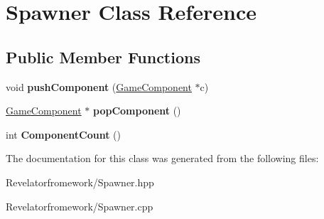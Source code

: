 \hypertarget{class_spawner}{\section{Spawner Class Reference}
\label{class_spawner}
}
\subsection*{Public Member Functions}
\begin{DoxyCompactItemize}
\item 
\hypertarget{class_spawner_a56762cb03662152ffb517f44f431599b}{void {\bfseries push\-Component} (\hyperlink{class_game_component}{Game\-Component} $\ast$c)}\label{class_spawner_a56762cb03662152ffb517f44f431599b}

\item 
\hypertarget{class_spawner_a2cb984bed31cef93edcb9dcfc27f47d0}{\hyperlink{class_game_component}{Game\-Component} $\ast$ {\bfseries pop\-Component} ()}\label{class_spawner_a2cb984bed31cef93edcb9dcfc27f47d0}

\item 
\hypertarget{class_spawner_a9b6caf4f8e980acd1537050792ab8583}{int {\bfseries Component\-Count} ()}\label{class_spawner_a9b6caf4f8e980acd1537050792ab8583}

\end{DoxyCompactItemize}


The documentation for this class was generated from the following files\-:\begin{DoxyCompactItemize}
\item 
Revelatorfromework/Spawner.\-hpp\item 
Revelatorfromework/Spawner.\-cpp\end{DoxyCompactItemize}
